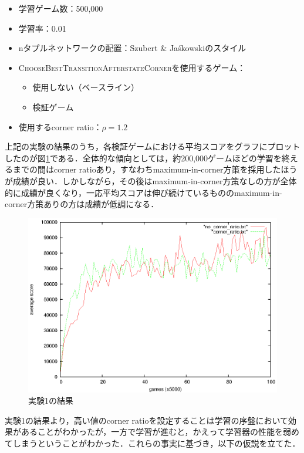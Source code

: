 \documentclass{suribt}
\begin{document}
\begin{itemize}
\item 学習ゲーム数：500,000
\item 学習率：0.01
\item nタプルネットワークの配置：Szubert \& Ja\'{s}kowskiのスタイル
\item \textsc{ChooseBestTransitionAfterstateCorner}を使用するゲーム：
\begin{itemize}
\item 使用しない（ベースライン）
\item 検証ゲーム
\end{itemize}
\item 使用するcorner ratio：${\rho}=1.2$
\end{itemize}

上記の実験の結果のうち，各検証ゲームにおける平均スコアをグラフにプロットしたのが図\ref{figure_006}である．全体的な傾向としては，約200,000ゲームほどの学習を終えるまでの間はcorner ratioあり，すなわちmaximum-in-corner方策を採用したほうが成績が良い．しかしながら，その後はmaximum-in-corner方策なしの方が全体的に成績が良くなり，一応平均スコアは伸び続けているもののmaximum-in-corner方策ありの方は成績が低調になる．

\begin{figure}[t]
	\begin{center}
	\includegraphics[width=13cm]{figure_006.eps}
	\caption{実験1の結果}
	\label{figure_006}
	\end{center}
\end{figure}

実験1の結果より，高い値のcorner ratioを設定することは学習の序盤において効果があることがわかったが，一方で学習が進むと，かえって学習器の性能を弱めてしまうということがわかった．これらの事実に基づき，以下の仮説を立てた．
\end{document}
